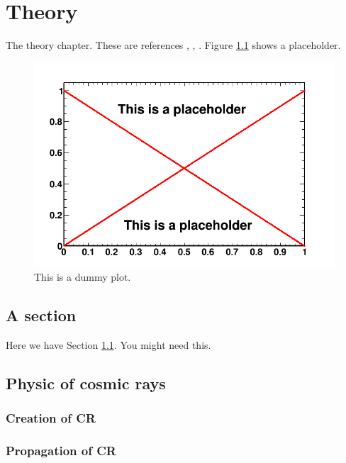 \chapter{Theory}
\label{ch:theory}
The theory chapter. These are references \cite{aPaper}, \cite{aThesis}, \cite{aWiki}. Figure \ref{fig:dummy} shows a placeholder. 

\begin{figure}
  \centering
  \includegraphics[width=.9\linewidth]{pic/dummy.png}
  \caption{This is a dummy plot.}
  \label{fig:dummy}
\end{figure}

\section{A section}
\label{sec:section}
Here we have Section \ref{sec:section}.  You might need this.


\section{Physic of cosmic rays}


\subsection{Creation of CR}


\subsection{Propagation of CR}

